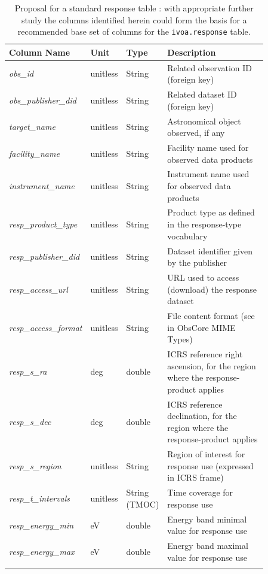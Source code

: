 {\small
 \begin{longtable}{|m{0.25\linewidth}|m{0.1\linewidth}|m{0.10\linewidth}|m{0.41\linewidth}|}
\hline
{\bf Column Name} & {\bf Unit} & {\bf Type} & {\bf Description}\\\hline
{\em obs\_id} & unitless & String & Related observation ID (foreign key) \\\hline
{\em obs\_publisher\_did} & unitless & String & Related dataset ID (foreign key) \\\hline
{\em target\_name} & unitless & String & Astronomical object observed, if any\\\hline
{\em facility\_name} & unitless & String & Facility name used for observed data products \\\hline
{\em instrument\_name} & unitless & String & Instrument name used for observed data products \\\hline
{\em resp\_product\_type} & unitless & String &  Product type as defined in the response-type vocabulary\\\hline
{\em resp\_publisher\_did} & unitless & String & Dataset identifier given by the publisher\\\hline
{\em resp\_access\_url} & unitless & String & URL used to access (download) the response dataset\\\hline
{\em resp\_access\_format} & unitless & String & File content format (see in Obs\-Core MIME Types)\\\hline
{\em resp\_s\_ra} & deg & double &  ICRS reference right ascension, for the region where the response-product applies \\\hline
{\em resp\_s\_dec} & deg & double & ICRS reference declination, for the region where the response-product applies\\\hline
{\em resp\_s\_region} & unitless & String & Region of interest for response use (expressed in ICRS frame)\\\hline
{\em resp\_t\_intervals} & unitless& String (TMOC) & Time coverage for response use \\\hline
{\em resp\_energy\_min} & eV & double & Energy band minimal value for response use  \\\hline
{\em resp\_energy\_max} & eV & double & Energy band maximal value for response use  \\\hline

\caption{Proposal for a standard response table :  with appropriate further study the columns identified herein could form the basis for a recommended base set of columns for the  {\tt ivoa.response} table.}
\label{tab:response_table}
\end{longtable}
}

